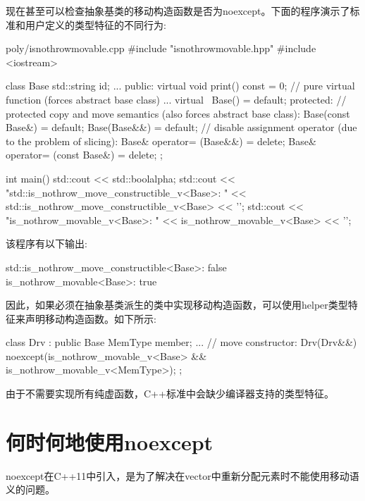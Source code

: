 现在甚至可以检查抽象基类的移动构造函数是否为noexcept。下面的程序演示了标准和用户定义的类型特征的不同行为:\par

\begin{codeboxt}[cpp]{poly/isnothrowmovable.cpp}
#include "isnothrowmovable.hpp"
#include <iostream>

class Base {
  std::string id;
  ...
public:
  virtual void print() const = 0; // pure virtual function (forces abstract base class)
  ...
  virtual ~Base() = default;
  protected:
  // protected copy and move semantics (also forces abstract base class):
  Base(const Base&) = default;
  Base(Base&&) = default;
  // disable assignment operator (due to the problem of slicing):
  Base& operator= (Base&&) = delete;
  Base& operator= (const Base&) = delete;
};

int main()
{
  std::cout << std::boolalpha;
  std::cout << "std::is_nothrow_move_constructible_v<Base>: "
  << std::is_nothrow_move_constructible_v<Base> << '\n';
  std::cout << "is_nothrow_movable_v<Base>: "
  << is_nothrow_movable_v<Base> << '\n';
}
\end{codeboxt}

该程序有以下输出:\par

\begin{myOutput}
std::is\_nothrow\_move\_constructible<Base>: false \\
is\_nothrow\_movable<Base>: true
\end{myOutput}

因此，如果必须在抽象基类派生的类中实现移动构造函数，可以使用helper类型特征来声明移动构造函数。如下所示:\par

\begin{codebox}[cpp]
class Drv : public Base {
  MemType member;
  ...
  // move constructor:
  Drv(Drv&&) noexcept(is_nothrow_movable_v<Base> &&
  is_nothrow_movable_v<MemType>);
};
\end{codebox}

由于不需要实现所有纯虚函数，C++标准中会缺少编译器支持的类型特征。\par


\section{何时何地使用noexcept}

noexcept在C++11中引入，是为了解决在vector中重新分配元素时不能使用移动语义的问题。\par

